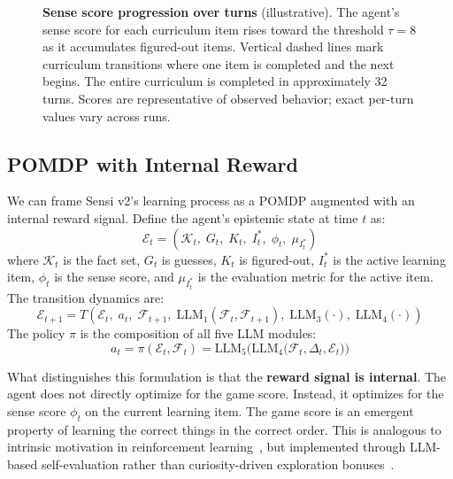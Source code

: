 \documentclass[11pt,letterpaper]{article}
\begin{document}
\begin{figure}[t]
  \caption{\textbf{Sense score progression over turns} (illustrative). The agent's sense score for each curriculum item rises toward the threshold $\tau = 8$ as it accumulates figured-out items. Vertical dashed lines mark curriculum transitions where one item is completed and the next begins. The entire curriculum is completed in approximately 32 turns. Scores are representative of observed behavior; exact per-turn values vary across runs.}
  \label{fig:sense_timeline}
\end{figure}

\subsection{POMDP with Internal Reward}
\label{sec:pomdp_v2}

We can frame Sensi v2's learning process as a POMDP augmented with an internal reward signal. Define the agent's epistemic state at time $t$ as:
\begin{equation}
  \mathcal{E}_t = \left(\mathcal{K}_t,\; G_t,\; K_t,\; I^*_t,\; \phi_t,\; \mu_{I^*_t}\right)
  \label{eq:epistemic}
\end{equation}
where $\mathcal{K}_t$ is the fact set, $G_t$ is guesses, $K_t$ is figured-out, $I^*_t$ is the active learning item, $\phi_t$ is the sense score, and $\mu_{I^*_t}$ is the evaluation metric for the active item. The transition dynamics are:
\begin{equation}
  \mathcal{E}_{t+1} = T\!\left(\mathcal{E}_t,\; a_t,\; \mathcal{F}_{t+1},\; \text{LLM}_1(\mathcal{F}_t, \mathcal{F}_{t+1}),\; \text{LLM}_3(\cdot),\; \text{LLM}_4(\cdot)\right)
  \label{eq:transition_dynamics}
\end{equation}
The policy $\pi$ is the composition of all five LLM modules:
\begin{equation}
  a_t = \pi(\mathcal{E}_t, \mathcal{F}_t) = \text{LLM}_5\!\Big(\text{LLM}_4\!\big(\mathcal{F}_t, \Delta_t, \mathcal{E}_t\big)\Big)
  \label{eq:policy}
\end{equation}

What distinguishes this formulation is that the \textbf{reward signal is internal}. The agent does not directly optimize for the game score. Instead, it optimizes for the sense score $\phi_t$ on the current learning item. The game score is an emergent property of learning the correct things in the correct order. This is analogous to intrinsic motivation in reinforcement learning~\citep{schmidhuber1991curious,pathak2017curiosity}, but implemented through LLM-based self-evaluation rather than curiosity-driven exploration bonuses~\citep{sutton1998reinforcement}.
\end{document}

